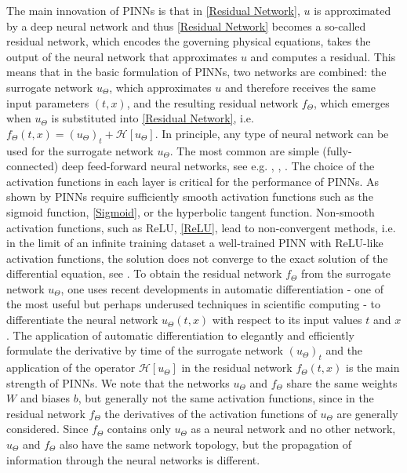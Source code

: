 The main innovation of PINNs is that in \cref{Residual Network}, $u$ is approximated by a deep neural network and thus \cref{Residual Network} becomes a so-called residual network, which encodes the governing physical equations, takes the output of the neural network that approximates $u$ and computes a residual. This means that in the basic formulation of PINNs, two networks are combined: the surrogate network $u_\Theta$, which approximates $u$ and therefore receives the same input parameters $(t,x)$, and the resulting residual network $f_\Theta$, which emerges when $u_\Theta$ is substituted into \cref{Residual Network}, i.e. $f_\Theta(t,x) = (u_\Theta)_t + \mathcal{H} \left[ u_\Theta \right]$. In principle, any type of neural network can be used for the surrogate network $u_\Theta$. The most common are simple (fully-connected) deep feed-forward neural networks, see e.g. \cite{RaissiPerdikarisKarniadakis:2019}, \cite{MishraMolinaro:2021}, \cite{Markidis:2021}. The choice of the activation functions in each layer is critical for the performance of PINNs. As shown by \cite{MishraMolinaro:2021} PINNs require sufficiently smooth activation functions such as the sigmoid function, \cref{Sigmoid}, or the hyperbolic tangent function. Non-smooth activation functions, such as ReLU, \cref{ReLU}, lead to non-convergent methods, i.e. in the limit of an infinite training dataset a well-trained PINN with ReLU-like activation functions, the solution does not converge to the exact solution of the differential equation, see \cite{MishraMolinaro:2021}. To obtain the residual network $f_\Theta$ from the surrogate network $u_\Theta$, one uses recent developments in automatic differentiation - one of the most useful but perhaps underused techniques in scientific computing - to differentiate the neural network $u_\Theta(t,x)$ with respect to its input values $t$ and $x$. The application of automatic differentiation to elegantly and efficiently formulate the derivative by time of the surrogate network $(u_\Theta)_t$ and the application of the operator $\mathcal{H} \left[ u_\Theta \right]$ in the residual network $f_\Theta(t,x)$ is the main strength of PINNs. We note that the networks $u_\Theta$ and $f_\Theta$ share the same weights $W$ and biases $b$, but generally not the same activation functions, since in the residual network $f_\Theta$ the derivatives of the activation functions of $u_\Theta$ are generally considered. Since $f_\Theta$ contains only $u_\Theta$ as a neural network and no other network, $u_\Theta$ and $f_\Theta$ also have the same network topology, but the propagation of information through the neural networks is different. \\
